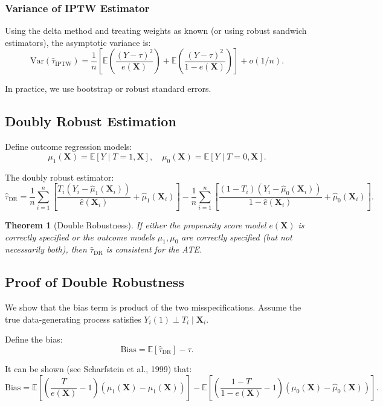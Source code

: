 \documentclass[12pt]{article}
\numberwithin{equation}{section}
\newtheorem{theorem}{Theorem}[section]
\begin{document}
	\subsubsection{Variance of IPTW Estimator}
	
	Using the delta method and treating weights as known (or using robust sandwich estimators), the asymptotic variance is:
	\[
	\text{Var}(\hat{\tau}_{\text{IPTW}}) = \frac{1}{n} \left[ \mathbb{E}\left(\frac{(Y - \tau)^2}{e(\mathbf{X})}\right) + \mathbb{E}\left(\frac{(Y - \tau)^2}{1-e(\mathbf{X})}\right) \right] + o(1/n).
	\]
	
	In practice, we use bootstrap or robust standard errors.
	
	\subsection{Doubly Robust Estimation}
	
	Define outcome regression models:
	\[
	\mu_1(\mathbf{X}) = \mathbb{E}[Y \mid T=1, \mathbf{X}], \quad \mu_0(\mathbf{X}) = \mathbb{E}[Y \mid T=0, \mathbf{X}].
	\]
	
	The doubly robust estimator:
	\[
	\hat{\tau}_{\text{DR}} = \frac{1}{n} \sum_{i=1}^n \left[ \frac{T_i(Y_i - \hat{\mu}_1(\mathbf{X}_i))}{\hat{e}(\mathbf{X}_i)} + \hat{\mu}_1(\mathbf{X}_i) \right] - \frac{1}{n} \sum_{i=1}^n \left[ \frac{(1-T_i)(Y_i - \hat{\mu}_0(\mathbf{X}_i))}{1-\hat{e}(\mathbf{X}_i)} + \hat{\mu}_0(\mathbf{X}_i) \right].
	\]
	
	\begin{theorem}[Double Robustness]
		If either the propensity score model $e(\mathbf{X})$ is correctly specified or the outcome models $\mu_1, \mu_0$ are correctly specified (but not necessarily both), then $\hat{\tau}_{\text{DR}}$ is consistent for the ATE.
	\end{theorem}
	
	\subsection{Proof of Double Robustness}
	
	We show that the bias term is product of the two misspecifications. Assume the true data-generating process satisfies $Y_i(1) \perp T_i \mid \mathbf{X}_i$.
	
	Define the bias:
	\[
	\text{Bias} = \mathbb{E}[\hat{\tau}_{\text{DR}}] - \tau.
	\]
	
	It can be shown (see Scharfstein et al., 1999) that:
	\[
	\text{Bias} = \mathbb{E}\left[ \left( \frac{T}{e(\mathbf{X})} - 1 \right) (\mu_1(\mathbf{X}) - \hat{\mu}_1(\mathbf{X})) \right] - \mathbb{E}\left[ \left( \frac{1-T}{1-e(\mathbf{X})} - 1 \right) (\mu_0(\mathbf{X}) - \hat{\mu}_0(\mathbf{X})) \right].
	\]
	
\end{document}
